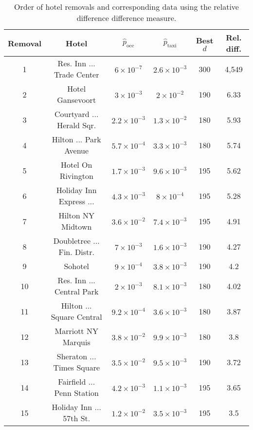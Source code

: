 \documentclass[useAMS, usenatbib]{biom}
\begin{document}
\begin{table}
\caption{Order of hotel removals and corresponding data using the relative difference difference measure.}
\label{t:relative_difference}
\begin{center}
\resizebox{\columnwidth}{!}
{
 \begin{tabular}{||c|c|c|c|c|c||}
 \hline
 Removal & Hotel & $\hat{p}_{\mathrm{occ}}$ & $\hat{p}_{\mathrm{taxi}}$ & Best $d$ & Rel. diff. \\ [0.5ex] 
 \hline
 1 & Res. Inn ... Trade Center & $6 \times 10^{-7}$ & $2.6 \times 10^{-3}$ & 300 & 4,549 \\
 2 & Hotel Gansevoort & $3 \times 10^{-3}$ & $2 \times 10^{-2}$ & 190 & 6.33 \\
 3 & Courtyard ... Herald Sqr. & $2.2 \times 10^{-3}$ & $1.3 \times 10^{-2}$ & 180 & 5.93 \\
 4 & Hilton ... Park Avenue & $5.7 \times 10^{-4}$ & $3.3 \times 10^{-3}$ & 180 & 5.74 \\
 5 & Hotel On Rivington & $1.7 \times 10^{-3}$ & $9.6 \times 10^{-3}$ & 195 & 5.62 \\
 6 & Holiday Inn Express ... & $4.3 \times 10^{-3}$ & $8 \times 10^{-4}$ & 195 & 5.28 \\
 7 & Hilton NY Midtown & $3.6 \times 10^{-2}$ & $7.4 \times 10^{-3}$ & 195 & 4.91 \\
 8 & Doubletree ... Fin. Distr. & $7 \times 10^{-3}$ & $1.6 \times 10^{-3}$ & 190 & 4.27 \\
 9 & Sohotel & $9 \times 10^{-4}$ & $3.8 \times 10^{-3}$ & 190 & 4.2 \\
 10 & Res. Inn ... Central Park & $2 \times 10^{-3}$ & $8.1 \times 10^{-3}$ & 180 & 4.02 \\
 11 & Hilton ... Square Central & $9.2 \times 10^{-4} $ & $3.6 \times 10^{-3}$ & 180 & 3.87 \\
 12 & Marriott NY Marquis & $3.8 \times 10^{-2}$ & $9.9 \times 10^{-3}$ & 180 & 3.8 \\
 13 & Sheraton ... Times Square & $3.5 \times 10^{-2}$ & $9.5 \times 10^{-3}$ & 190 & 3.72 \\
 14 & Fairfield ... Penn Station & $4.2 \times 10^{-3}$ & $1.1 \times 10^{-3}$ & 195 & 3.65 \\
 15 & Holiday Inn ... 57th St. & $1.2 \times 10^{-2}$ & $3.5 \times 10^{-3}$ & 195 & 3.5 \\
 \hline
\end{tabular}
}
\end{center}
\end{table}
\end{document}
